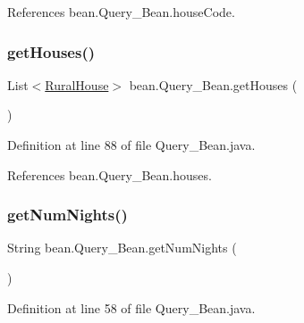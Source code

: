 References bean.\+Query\+\_\+\+Bean.\+house\+Code.

\mbox{\label{classbean_1_1Query__Bean_aefdbf74a5f2ddbf5b047f5ad56245de5}} 
\subsubsection{\texorpdfstring{getHouses()}{getHouses()}}
{\footnotesize\ttfamily List$<$\mbox{\hyperlink{classdomain_1_1RuralHouse}{Rural\+House}}$>$ bean.\+Query\+\_\+\+Bean.\+get\+Houses (\begin{DoxyParamCaption}{ }\end{DoxyParamCaption})}



Definition at line 88 of file Query\+\_\+\+Bean.\+java.


\begin{DoxyCode}{0}

\end{DoxyCode}


References bean.\+Query\+\_\+\+Bean.\+houses.

\mbox{\label{classbean_1_1Query__Bean_ab979d29b59d31df3848b6a2420cbbc70}} 
\subsubsection{\texorpdfstring{getNumNights()}{getNumNights()}}
{\footnotesize\ttfamily String bean.\+Query\+\_\+\+Bean.\+get\+Num\+Nights (\begin{DoxyParamCaption}{ }\end{DoxyParamCaption})}



Definition at line 58 of file Query\+\_\+\+Bean.\+java.


\begin{DoxyCode}{0}

\end{DoxyCode}


